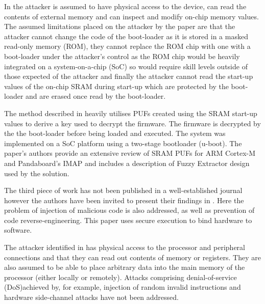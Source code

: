 \ifnotesincluded
{}
\fi

In \cite{Schaller2014} the attacker is assumed to have physical access to the device, can read the contents of external memory and can inspect and modify on-chip memory values. The assumed limitations placed on the attacker by the paper are that the attacker cannot change the code of the boot-loader as it is stored in a masked read-only memory (ROM), they cannot replace the ROM chip with one with a boot-loader under the attacker's control as the ROM chip would be heavily integrated on a system-on-a-chip (SoC) so would require skill levels outside of those expected of the attacker and finally the attacker cannot read the start-up values of the on-chip SRAM during start-up which are protected by the boot-loader and are erased once read by the boot-loader.

\ifnotesincluded
{}
\fi

The method described in \cite{Schaller2014} heavily utilises PUFs created using the SRAM start-up values to derive a key used to decrypt the firmware. The firmware is decrypted by the the boot-loader before being loaded and executed. The system was implemented on a SoC platform using a two-stage bootloader (u-boot). The paper's authors provide an extensive review of SRAM PUFs for ARM Cortex-M and Pandaboard's IMAP and includes a description of Fuzzy Extractor design used by the solution.

\ifnotesincluded
{}
\fi


The third piece of work \cite{Kleber2015} has not been published in a well-established journal however the authors have been invited to present their findings in \cite{Kleber2015a}. Here the problem of injection of malicious code is also addressed, as well as prevention of code reverse-engineering. This paper uses secure execution to bind hardware to software.

The attacker identified in \cite{Kleber2015} has physical access to the processor and peripheral connections and that they can read out contents of memory or registers. They are also assumed to be able to place arbitrary data into the main memory of the processor (either locally or remotely). Attacks comprising denial-of-service (DoS)achieved by, for example, injection of random invalid instructions and hardware side-channel attacks have not been addressed.

